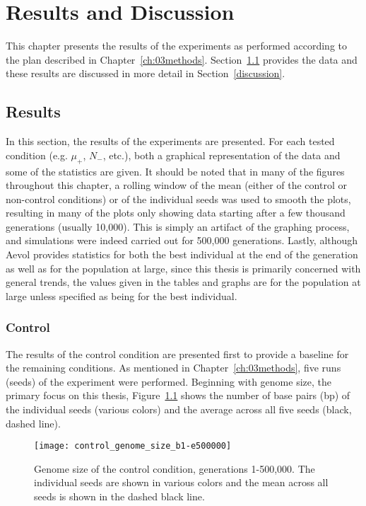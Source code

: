 \chapter{Results and Discussion}\label{ch:04results_discussion}

This chapter presents the results of the experiments as performed according to the plan described in Chapter~\ref{ch:03methods}. Section~\ref{results} provides the data and these results are discussed in more detail in Section~\ref{discussion}. 

\section{Results}\label{results}
In this section, the results of the experiments are presented. For each tested condition (e.g. $\mu_+$, $N_-$, etc.), both a graphical representation of the data and some of the statistics are given. It should be noted that in many of the figures throughout this chapter, a rolling window of the mean (either of the control or non-control conditions) or of the individual seeds was used to smooth the plots, resulting in many of the plots only showing data starting after a few thousand generations (usually 10,000). This is simply an artifact of the graphing process, and simulations were indeed carried out for 500,000 generations. Lastly, although Aevol provides statistics for both the best individual at the end of the generation as well as for the population at large, since this thesis is primarily concerned with general trends, the values given in the tables and graphs are for the population at large unless specified as being for the best individual. 
\subsection{Control}
The results of the control condition are presented first to provide a baseline for the remaining conditions. As mentioned in Chapter~\ref{ch:03methods}, five runs (seeds) of the experiment were performed. Beginning with genome size, the primary focus on this thesis, Figure~\ref{fig:control_genome_size} shows the number of base pairs (bp) of the individual seeds (various colors) and the average across all five seeds (black, dashed line). 

\begin{figure}[H]
	\centering
	\texttt{[image: control\_genome\_size\_b1-e500000]}
	\caption[Control genome size, all seeds]{Genome size of the control condition, generations 1-500,000. The individual seeds are shown in various colors and the mean across all seeds is shown in the dashed black line.}
	\label{fig:control_genome_size}
\end{figure}

